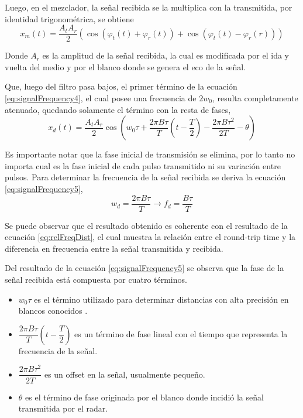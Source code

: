 Luego, en el mezclador, la señal recibida se la multiplica con la transmitida, por identidad trigonométrica, se obtiene
\begin{equation}
  x_m(t) = \dfrac{A_tA_r}{2}(\cos(\varphi_t(t)+\varphi_r(t)) + \cos(\varphi_t(t)- \varphi_r(r)))
  \label{eq:signalFrequency4}
\end{equation}

Donde $A_r$ es la amplitud de la señal recibida, la cual es modificada por el ida y vuelta del medio y por el blanco donde se genera el eco de la señal.

Que, luego del filtro pasa bajos, el primer término de la ecuación \ref{eq:signalFrequency4}, el cual posee una frecuencia de $2w_0$, resulta completamente atenuado, quedando solamente el término con la resta de fases,
\begin{equation}
  x_d(t) = \dfrac{A_tA_r}{2}\cos(w_0\tau + \dfrac{2\pi B\tau}{T}(t - \dfrac{T}{2}) - \dfrac{2\pi B\tau^2}{2T} - \theta)
  \label{eq:signalFrequency5}
\end{equation}

Es importante notar que la fase inicial de transmisión se elimina, por lo tanto no importa cual es la fase inicial de cada pulso
transmitido ni su variación entre pulsos. Para determinar la frecuencia de la señal recibida se deriva la ecuación \ref{eq:signalFrequency5}, 
\begin{equation}\label{eq:beatFreq}
  w_d = \dfrac{2\pi B\tau}{T} \rightarrow f_d = \dfrac{B\tau}{T}
\end{equation}

Se puede observar que el resultado obtenido es coherente con el resultado de la ecuación \ref{eq:relFreqDist}, el cual muestra la relación entre el round-trip time y la diferencia en frecuencia entre la señal transmitida y recibida.

Del resultado de la ecuación \ref{eq:signalFrequency5} se observa que la fase de la señal recibida está compuesta por cuatro términos.
\begin{itemize}
  \item $w_0\tau$ es el término utilizado para determinar distancias con alta precisión en blancos conocidos \cite{Brennan2014a}.
  \item $\dfrac{2\pi B\tau}{T}(t - \dfrac{T}{2})$ es un término de fase lineal con el tiempo que representa la frecuencia de la señal.
  \item $\dfrac{2\pi B\tau^2}{2T}$ es un offset en la señal, usualmente pequeño.
  \item $\theta$ es el término de fase originada por el blanco donde incidió la señal transmitida por el radar.
\end{itemize}

